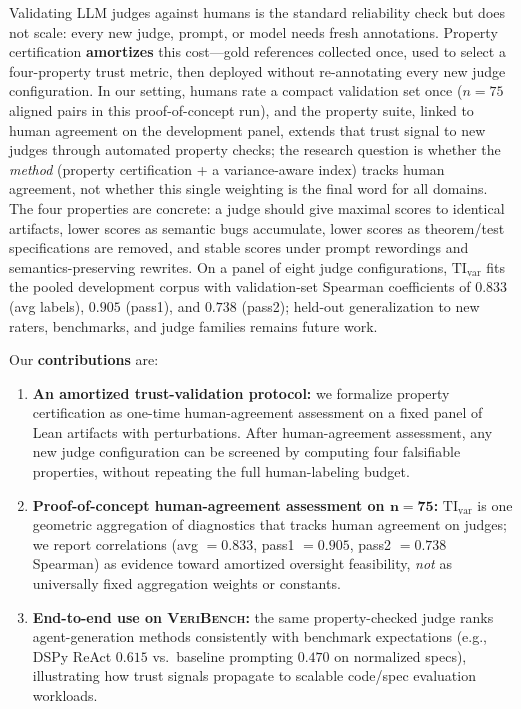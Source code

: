 \documentclass{article}
\begin{document}
Validating LLM judges against humans is the standard reliability check but does not scale: every new judge, prompt, or model needs fresh annotations.
Property certification \textbf{amortizes} this cost---gold references collected once, used to select a four-property trust metric, then deployed without re-annotating every new judge configuration.
In our setting, humans rate a compact validation set once (\(n {=} 75\) aligned pairs in this proof-of-concept run), and the property suite, linked to human agreement on the development panel, extends that trust signal to new judges through automated property checks; the research question is whether the \emph{method} (property certification + a variance-aware index) tracks human agreement, not whether this single weighting is the final word for all domains.
The four properties are concrete: a judge should give maximal scores to identical artifacts, lower scores as semantic bugs accumulate, lower scores as theorem/test specifications are removed, and stable scores under prompt rewordings and semantics-preserving rewrites.
On a panel of eight judge configurations, \(\mathrm{TI}_{\mathrm{var}}\) fits the pooled development corpus with validation-set Spearman coefficients of \(0.833\) (avg labels), \(0.905\) (pass1), and \(0.738\) (pass2); held-out generalization to new raters, benchmarks, and judge families remains future work.

Our \textbf{contributions} are:
\begin{enumerate}
  \item \textbf{An amortized trust-validation protocol:} we formalize property certification as one-time human-agreement assessment on a fixed panel of Lean artifacts with perturbations. After human-agreement assessment, any new judge configuration can be screened by computing four falsifiable properties, without repeating the full human-labeling budget.

  \item \textbf{Proof-of-concept human-agreement assessment on \(\bm{n{=}75}\):} \(\mathrm{TI}_{\mathrm{var}}\) is one geometric aggregation of diagnostics that tracks human agreement on judges; we report correlations (avg \(=0.833\), pass1 \(=0.905\), pass2 \(=0.738\) Spearman) as evidence toward amortized oversight feasibility, \emph{not} as universally fixed aggregation weights or constants.
  \item \textbf{End-to-end use on \textsc{VeriBench}:} the same property-checked judge ranks agent-generation methods consistently with benchmark expectations (e.g., DSPy ReAct \(0.615\) vs.\ baseline prompting \(0.470\) on normalized specs), illustrating how trust signals propagate to scalable code/spec evaluation workloads.
\end{enumerate}
\end{document}
